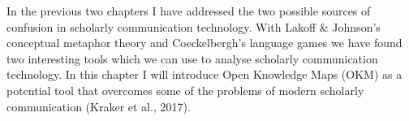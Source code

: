 In the previous two chapters I have addressed the two possible sources of confusion in scholarly communication technology. With Lakoff & Johnson’s conceptual metaphor theory and Coeckelbergh’s language games we have found two interesting tools which we can use to analyse scholarly communication technology. In this chapter I will introduce Open Knowledge Maps (OKM) as a potential tool that overcomes some of the problems of modern scholarly communication (Kraker et al., 2017).